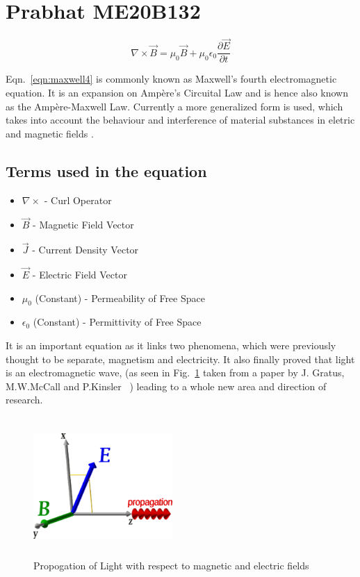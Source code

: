 \section{Prabhat ME20B132}

\begin{equation}
\nabla\times\vec{B} = \mu_0\vec{B} + \mu_0\epsilon_0 \frac{\partial \vec{E}}{\partial t}
\label{eqn:maxwell4}
\end{equation}

Eqn.~\ref{eqn:maxwell4} is commonly known as Maxwell's fourth electromagnetic equation. It is an expansion on Amp\`{e}re's Circuital Law and is hence also known as the Amp\`{e}re-Maxwell Law. Currently a more generalized form is used, which takes into account the behaviour and interference of material substances in eletric and magnetic fields \cite{Gratus2020}.

\subsection{Terms used in the equation}
\begin{itemize}
\item $\nabla\times$ - Curl Operator
\item $\vec{B}$ - Magnetic Field Vector
\item $\vec{J}$ - Current Density Vector
\item $\vec{E}$ - Electric Field Vector
\item $\mu_0$ (Constant) - Permeability of Free Space
\item $\epsilon_0$ (Constant) - Permittivity of Free Space
\end{itemize}

It is an important equation as it links two phenomena, which were previously thought to be separate, magnetism and electricity. It also finally proved that light is an electromagnetic wave, (as seen in Fig.~\ref{fig:light} taken from a paper by J. Gratus, M.W.McCall and P.Kinsler ~\cite{Gratus2020}) leading to a whole new area and direction of research.

\begin{figure}[h]
\centerline{\includegraphics[width=200px,height=200px]{me20b132/me20b132.eps}}
\caption{Propogation of Light with respect to magnetic and electric fields}
\label{fig:light}
\end{figure} 

